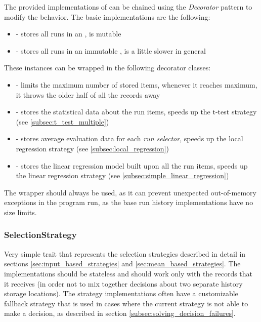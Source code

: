 The provided implementations of  can be chained using the \textit{Decorator} pattern to modify the behavior. The basic implementations are the following:
\begin{itemize}
	\item {} - stores all runs in an , is mutable
	\item {} - stores all runs in an immutable , is a little slower in general
\end{itemize}

These instances can be wrapped in the following decorator classes:
\begin{itemize}
	\item {} - limits the maximum number of stored items, whenever it reaches maximum, it throws the older half of all the records away
	\item {} - stores the statistical data about the run items, speeds up the t-test strategy (see \ref{subsec:t_test_multiple})
	\item {} - stores average evaluation data for each \textit{run selector}, speeds up the local regression strategy (see \ref{subsec:local_regression})
	\item {} - stores the linear regression model built upon all the run items, speeds up the linear regression strategy (see \ref{subsec:simple_linear_regression})
\end{itemize}

The  wrapper should always be used, as it can prevent unexpected out-of-memory exceptions in the program run, as the base run history implementations have no size limits.

\subsubsection{SelectionStrategy}
\label{subsubsec:selection_strategy_impl}

Very simple trait that represents the selection strategies described in detail in sections \ref{sec:input_based_strategies} and \ref{sec:mean_based_strategies}. The implementations should be stateless and should work only with the  records that it receives (in order not to mix together decisions about two separate history storage locations). The strategy implementations often have a customizable fallback strategy that is used in cases where the current strategy is not able to make a decision, as described in section \ref{subsec:solving_decision_failures}.

